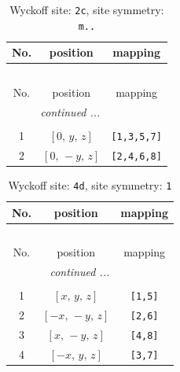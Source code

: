 \documentclass[fleqn,8pt]{jsarticle}
\begin{document}
\begin{longtable}{ccc}
\caption{Wyckoff site: {\tt 2c}, site symmetry: {\tt m..}}
 \\
 \hline \hline
No. & position & mapping \\ \hline \endfirsthead

\multicolumn{2}{l}{\tablename\ \thetable{}} \\
 \hline \hline
No. & position & mapping \\ \hline \endhead

 \hline \hline
\multicolumn{2}{r}{\footnotesize\it continued ...} \\ \endfoot

 \hline \hline
\multicolumn{2}{r}{} \\ \endlastfoot

1 & $\left[ 0,\, y,\, z \right]$ & {\tt [1,3,5,7]} \\ \hline
2 & $\left[ 0,\, - y,\, z \right]$ & {\tt [2,4,6,8]} \\
\end{longtable}
\renewcommand{\arraystretch}{1.2}
\begin{longtable}{ccc}
\caption{Wyckoff site: {\tt 4d}, site symmetry: {\tt 1}}
 \\
 \hline \hline
No. & position & mapping \\ \hline \endfirsthead

\multicolumn{2}{l}{\tablename\ \thetable{}} \\
 \hline \hline
No. & position & mapping \\ \hline \endhead

 \hline \hline
\multicolumn{2}{r}{\footnotesize\it continued ...} \\ \endfoot

 \hline \hline
\multicolumn{2}{r}{} \\ \endlastfoot

1 & $\left[ x,\, y,\, z \right]$ & {\tt [1,5]} \\ \hline
2 & $\left[ - x,\, - y,\, z \right]$ & {\tt [2,6]} \\ \hline
3 & $\left[ x,\, - y,\, z \right]$ & {\tt [4,8]} \\ \hline
4 & $\left[ - x,\, y,\, z \right]$ & {\tt [3,7]} \\
\end{longtable}
\end{document}
